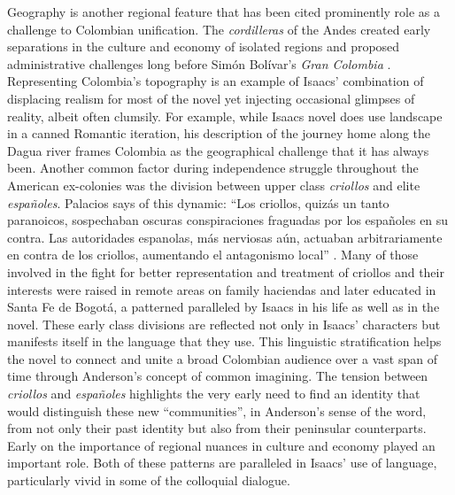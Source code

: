 \documentclass[12pt]{report}
\begin{document}
Geography is another regional feature that has been cited prominently role as a challenge to Colombian unification.
The \textit{cordilleras} of the Andes created early separations in the culture and economy of isolated regions and proposed administrative challenges long before Simón Bolívar's \textit{Gran Colombia} \autocite[229]{Palacios2002}.
Representing Colombia's topography is an example of Isaacs' combination of displacing realism for most of the novel yet injecting occasional glimpses of reality, albeit often clumsily. 
For example, while Isaacs novel does use landscape in a canned Romantic iteration, his description of the journey home along the Dagua river frames Colombia as the geographical challenge that it has always been.
Another common factor during independence struggle throughout the American ex-colonies was the division between upper class \textit{criollos} and elite \textit{españoles}. 
Palacios says of this dynamic: \enquote{Los criollos, quizás un tanto paranoicos, sospechaban oscuras conspiraciones fraguadas por los españoles en su contra. Las autoridades espanolas, más nerviosas aún, actuaban arbitrariamente en contra de los criollos, aumentando el antagonismo local} \autocite[192]{Palacios2002}. 
Many of those involved in the fight for better representation and treatment of criollos and their interests were raised in remote areas on family haciendas and later educated in Santa Fe de Bogotá, a patterned paralleled by Isaacs in his life as well as in the novel. 
These early class divisions are reflected not only in Isaacs' characters but manifests itself in the language that they use. 
This linguistic stratification helps the novel to connect and unite a broad Colombian audience over a vast span of time through Anderson's concept of common imagining.
The tension between \textit{criollos} and \textit{españoles} highlights the very early need to find an identity that would distinguish these new \enquote{communities}, in Anderson's sense of the word, from not only their past identity but also from their peninsular counterparts. 
Early on the importance of regional nuances in culture and economy played an important role.
Both of these patterns are paralleled in Isaacs' use of language, particularly vivid in some of the colloquial dialogue.
\end{document}
